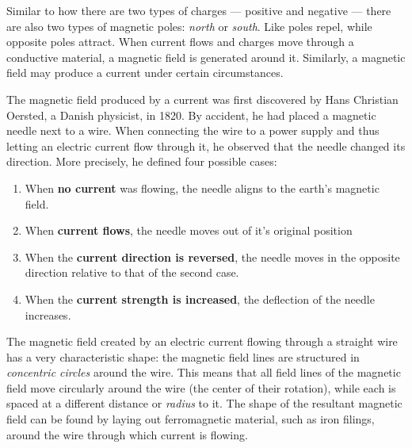 



\thispagestyle{plain}


Similar to how there are two types of charges --- positive and negative --- there are also two types of magnetic poles: \emph{north} or \emph{south}. Like poles repel, while opposite poles attract. When current flows and charges move through a conductive material, a magnetic field is generated around it. Similarly, a magnetic field may produce a current under certain circumstances. 

The magnetic field produced by a current was first discovered by Hans Christian Oersted, a Danish physicist, in 1820. By accident, he had placed a magnetic needle next to a wire. When connecting the wire to a power supply and thus letting an electric current flow through it, he observed that the needle changed its direction. More precisely, he defined four possible cases:

\begin{enumerate}
	\item When \textbf{no current} was flowing, the needle aligns to the earth's magnetic field.

	\item When \textbf{current flows}, the needle moves out of it's original position

	\item When the \textbf{current direction is reversed}, the needle moves in the opposite direction relative to that of the second case.

	\item When the \textbf{current strength is increased}, the deflection of the needle increases.
\end{enumerate}


The magnetic field created by an electric current flowing through a straight wire has a very characteristic shape: the magnetic field lines are structured in \emph{concentric circles} around the wire. This means that all field lines of the magnetic field move circularly around the wire (the center of their rotation), while each is spaced at a different distance or \emph{radius} to it. The shape of the resultant magnetic field can be found by laying out ferromagnetic material, such as iron filings, around the wire through which current is flowing.

